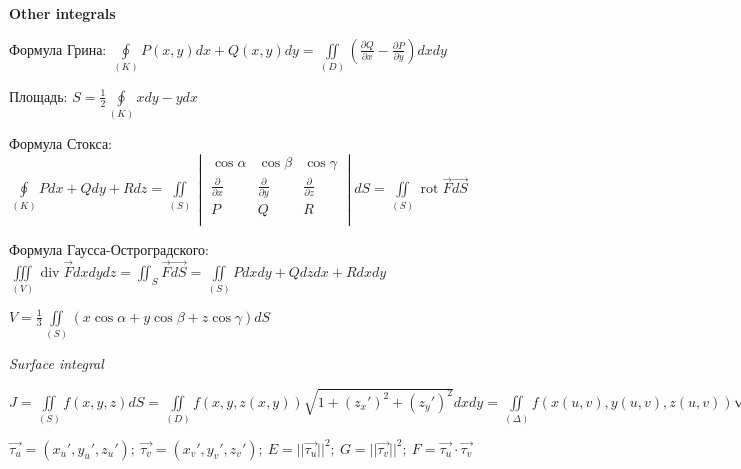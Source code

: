 \begin{center}
    \textbf{Other integrals}
\end{center}

Формула Грина: $\displaystyle\oint\limits_{(K)}P(x, y)dx + Q(x, y)dy = \iint\limits_{(D)}\left(\frac{\partial Q}{\partial x} - \frac{\partial P}{\partial y}\right)dxdy$

Площадь: $S = \frac{1}{2}\oint\limits_{(K)}xdy - ydx$

Формула Стокса: $\displaystyle \oint\limits_{(K)} Pdx + Qdy + Rdz = \iint\limits_{(S)}\begin{vmatrix}
    \cos{\alpha} & \cos{\beta} & \cos{\gamma} \\
    \frac{\partial}{\partial{x}} & \frac{\partial}{\partial{y}} & \frac{\partial}{\partial{z}} \\
    P & Q & R \\
\end{vmatrix}dS =  \iint\limits_{(S)} \operatorname{rot}\vec{F} \vec{dS}$ 

Формула Гаусса-Остроградского: $\displaystyle \iiint\limits_{(V)} \operatorname{div}\vec{F}dxdydz = \iint_S \vec{F}\vec{dS} = \iint\limits_{(S)}Pdxdy + Qdzdx + Rdxdy$ 

$\displaystyle V = \frac{1}{3}\iint\limits_{(S)}(x\cos{\alpha} + y\cos{\beta} + z\cos{\gamma})dS$

\vspace{2ex}
\textit{Surface integral}

$\displaystyle J = \iint\limits_{(S)}f(x, y, z)dS = \iint\limits_{(D)}f(x, y, z(x, y))\sqrt{1+(z_x')^2+(z_y')^2}dxdy = \iint\limits_{(\Delta)}f(x(u,v),y(u,v),z(u,v))\sqrt{EG - F^2}dudv$

$\displaystyle \vec{\tau_u} = (x_u',y_u',z_u'); ~\vec{\tau_v} = (x_v',y_v',z_v'); ~E = ||\vec{\tau_u}||^2; ~G = ||\vec{\tau_v}||^2; ~F = \vec{\tau_u} \cdot \vec{\tau_v}$
























